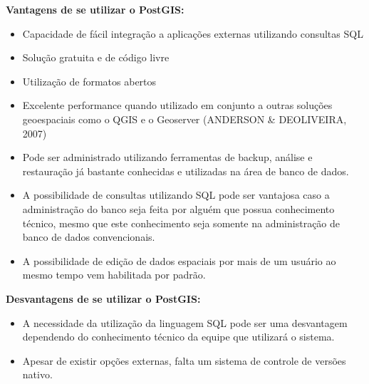 \textbf{Vantagens de se utilizar o PostGIS:}

	\begin{itemize}
		\item Capacidade de fácil integração a aplicações externas utilizando consultas SQL
		\item Solução gratuita e de código livre
		\item Utilização de formatos abertos
		\item Excelente performance quando utilizado em conjunto a outras soluções geoespaciais como o QGIS e o Geoserver (ANDERSON \& DEOLIVEIRA, 2007)
		\item Pode ser administrado utilizando ferramentas de backup, análise e restauração já bastante conhecidas e utilizadas na área de banco de dados.
		\item A possibilidade de consultas utilizando SQL pode ser vantajosa caso a administração do banco seja feita por alguém que possua conhecimento técnico, mesmo que este conhecimento seja somente na administração de banco de dados convencionais.
		\item A possibilidade de edição de dados espaciais por mais de um usuário ao mesmo tempo vem habilitada por padrão.
	\end{itemize}

\textbf{Desvantagens de se utilizar o PostGIS:}

	\begin{itemize}
		\item A necessidade da utilização da linguagem SQL pode ser uma desvantagem dependendo do conhecimento técnico da equipe que utilizará o sistema.
		\item Apesar de existir opções externas, falta um sistema de controle de versões nativo.
	\end{itemize}